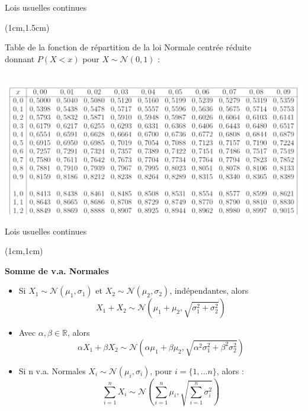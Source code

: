 \documentclass{beamer}
\newcommand{\R}{\mathbb{R}}
\begin{document}
\begin{frame}{Lois usuelles continues}
\begin{textblock*}{\textwidth}(1cm,1.5cm)


Table de la fonction de répartition de la loi Normale centrée réduite \\ donnant $P(X<x)$ pour $X\sim \mathcal{N}(0,1)$ : \\

\

\includegraphics[scale=0.43]{images/table_norm_CR.png}

\end{textblock*}

\end{frame}





\begin{frame}{Lois usuelles continues}
\begin{textblock*}{\textwidth}(1cm,1cm)

\begin{center}{\bf \Large Somme de v.a. Normales} \end{center}

\begin{itemize}
\item Si $X_1\sim \mathcal{N}(\mu_1,\sigma_1)$ et $X_2\sim\mathcal{N}(\mu_2,\sigma_2)$, indépendantes, alors
 $$X_1 + X_2\sim \mathcal{N}\left(\mu_1+\mu_2,\sqrt{\sigma_1^2+\sigma_2^2}\right)$$

\item Avec $\alpha, \beta \in \R$, alors
 $$\alpha X_1 + \beta X_2\sim \mathcal{N}\left(\alpha\mu_1+\beta\mu_2,\sqrt{\alpha^2\sigma_1^2+\beta^2\sigma_2^2}\right)$$

\item Si n v.a. Normales $X_i\sim \mathcal{N}(\mu_i,\sigma_i)$, pour $i=\{1, ...n\}$, alors :
 $$\sum_{i=1}^n X_i \sim \mathcal{N}\left(\sum_{i=1}^n \mu_i,\sqrt{\sum_{i=1}^n \sigma_i^2}\right)$$
\end{itemize}


\end{textblock*}

\end{frame}
\end{document}
